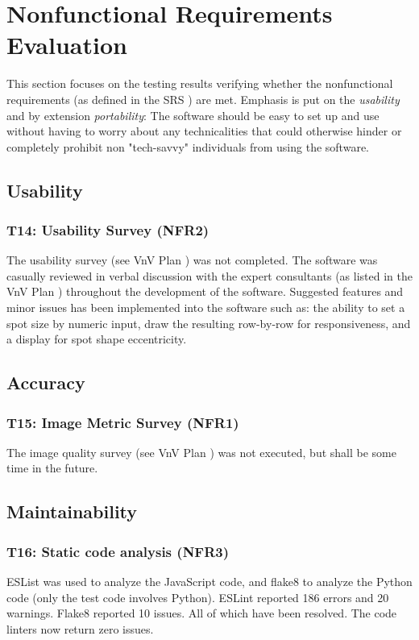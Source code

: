 \documentclass[12pt, titlepage]{article}
\begin{document}
\newpage
\clearpage

\section{Nonfunctional Requirements Evaluation}
This section focuses on the testing results verifying whether the nonfunctional requirements
(as defined in the SRS \cite{SRS}) are met. Emphasis is put on the \textit{usability} and
by extension \textit{portability}: The software should be easy to set up and use without
having to worry about any technicalities that could otherwise hinder or completely
prohibit non "tech-savvy" individuals from using the software.

\subsection{Usability}
\subsubsection{T14: Usability Survey (NFR2)}
The usability survey (see VnV Plan \cite{VnV_plan}) was not completed.
The software was casually reviewed in verbal discussion
with the expert consultants (as listed in the VnV Plan \cite{VnV_plan})
throughout the development of the software. Suggested features and minor issues has been
implemented into the software such as: the ability to set a spot size by numeric input,
draw the resulting row-by-row for responsiveness, and a display for spot shape eccentricity.

\subsection{Accuracy}
\subsubsection{T15: Image Metric Survey (NFR1)}
The image quality survey (see VnV Plan \cite{VnV_plan}) was not executed, but shall be some time in the future.

\subsection{Maintainability}
\subsubsection{T16: Static code analysis (NFR3)}
ESList was used to analyze the JavaScript code, and flake8 to analyze the Python code (only the
test code involves Python). ESLint reported 186 errors and 20 warnings. Flake8 reported
10 issues. All of which have been resolved. The code linters now return zero issues.
\end{document}
